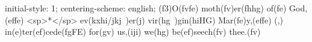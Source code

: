 initial-style: 1;
centering-scheme: english;
(f3)O(fvfe) moth(fv)er(fhhg) of(fe) God,(effe) <sp>*</sp> ev(kxhi/jkj~)er(j) vir(hg~)gin(hiHG) Mar(fe)y,(effe) (,) in(e)ter(ef)cede(fgFE) for(gv) us,(iji) we(hg) be(ef)seech(fv) thee.(fv)
